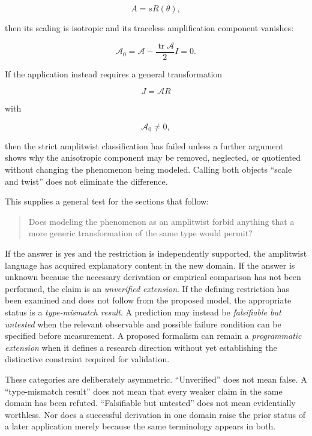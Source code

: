 \documentclass[11pt]{article}
\begin{document}
\begin{equation}
A=sR(\theta),
\end{equation}

then its scaling is isotropic and its traceless amplification component vanishes:

\begin{equation}
\mathcal A_0
=
\mathcal A
-
\frac{\operatorname{tr}\mathcal A}{2}I
=
0.
\end{equation}

If the application instead requires a general transformation

\begin{equation}
J=\mathcal A R
\end{equation}

with

\begin{equation}
\mathcal A_0\neq0,
\end{equation}

then the strict amplitwist classification has failed unless a further argument shows why the anisotropic component may be removed, neglected, or quotiented without changing the phenomenon being modeled. Calling both objects ``scale and twist'' does not eliminate the difference.

This supplies a general test for the sections that follow:

\begin{quote}
Does modeling the phenomenon as an amplitwist forbid anything that a more generic transformation of the same type would permit?
\end{quote}

If the answer is yes and the restriction is independently supported, the amplitwist language has acquired explanatory content in the new domain. If the answer is unknown because the necessary derivation or empirical comparison has not been performed, the claim is an \emph{unverified extension}. If the defining restriction has been examined and does not follow from the proposed model, the appropriate status is a \emph{type-mismatch result}. A prediction may instead be \emph{falsifiable but untested} when the relevant observable and possible failure condition can be specified before measurement. A proposed formalism can remain a \emph{programmatic extension} when it defines a research direction without yet establishing the distinctive constraint required for validation.

These categories are deliberately asymmetric. ``Unverified'' does not mean false. A ``type-mismatch result'' does not mean that every weaker claim in the same domain has been refuted. ``Falsifiable but untested'' does not mean evidentially worthless. Nor does a successful derivation in one domain raise the prior status of a later application merely because the same terminology appears in both.
\end{document}
